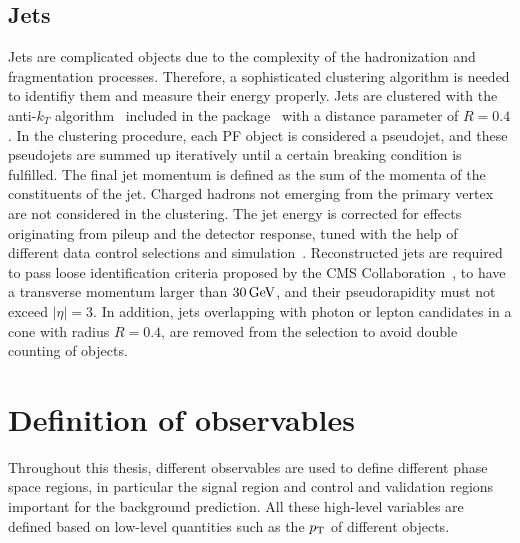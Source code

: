 \subsection{Jets}
Jets are complicated objects due to the complexity of the hadronization and fragmentation processes. Therefore, a sophisticated clustering algorithm is needed to identifiy them and measure their energy properly. Jets are clustered with the anti-$k_T$ algorithm~\cite{AntiKT} included in the \FASTJET package~\cite{FastJet1,FastJet2} with a distance parameter of $R=0.4$. In the clustering procedure, each PF object is considered a pseudojet, and these pseudojets are summed up iteratively until a certain breaking condition is fulfilled. The final jet momentum is defined as the sum of the momenta of the constituents of the jet. Charged hadrons not emerging from the primary vertex are not considered in the clustering. The jet energy is corrected for effects originating from pileup and the detector response, tuned with the help of different data control selections and simulation~\cite{JEC}. Reconstructed jets are required to pass loose identification criteria proposed by the CMS Collaboration~\cite{JetID}, to have a transverse momentum larger than $30\,\text{Ge\hspace{-.08em}V}$, and their pseudorapidity must not exceed $|\eta|=3$. In addition, jets overlapping with photon or lepton candidates in a cone with radius $R=0.4$, are removed from the selection to avoid double counting of objects.


\section{Definition of observables}
Throughout this thesis, different observables are used to define different phase space regions, in particular the signal region and control and validation regions important for the background prediction. All these high-level variables are defined based on low-level quantities such as the $p_{\mathrm{T}}$ of different objects.


